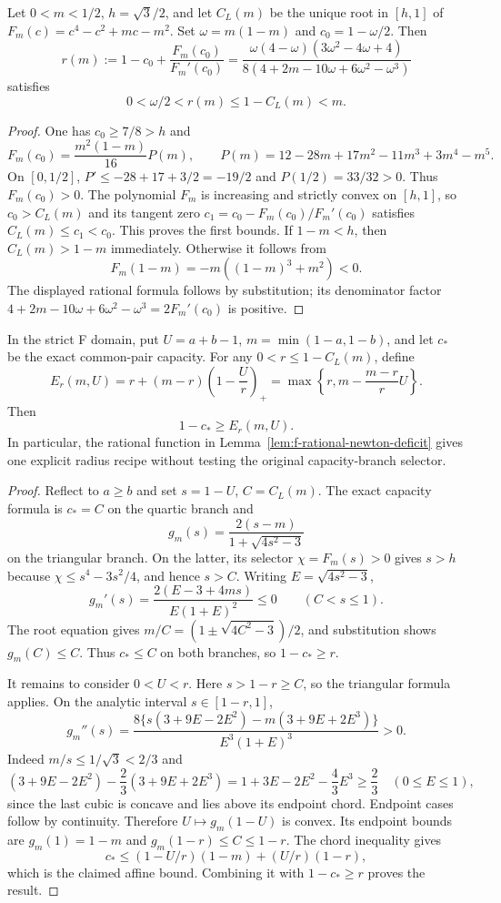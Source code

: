 \begin{lemma}
\label{lem:f-rational-newton-deficit}
Let $0<m<1/2$, $h=\sqrt3/2$, and let $C_L(m)$ be the unique root in
$[h,1]$ of $F_m(c)=c^4-c^2+mc-m^2$.
Set $\omega=m(1-m)$ and $c_0=1-\omega/2$. Then
\[
 r(m):=1-c_0+\frac{F_m(c_0)}{F_m'(c_0)}
 =\frac{\omega(4-\omega)(3\omega^2-4\omega+4)}
 {8(4+2m-10\omega+6\omega^2-\omega^3)}
\]
satisfies
\[
0<\omega/2<r(m)\le1-C_L(m)<m.
\]
\end{lemma}
\begin{proof}
One has $c_0\ge7/8>h$ and
\[
 F_m(c_0)=\frac{m^2(1-m)}{16}P(m),\qquad
 P(m)=12-28m+17m^2-11m^3+3m^4-m^5.
\]
On $[0,1/2]$, $P'\le-28+17+3/2=-19/2$ and
$P(1/2)=33/32>0$. Thus $F_m(c_0)>0$.
The polynomial $F_m$ is increasing and strictly convex on $[h,1]$,
so $c_0>C_L(m)$ and its tangent zero
$c_1=c_0-F_m(c_0)/F_m'(c_0)$ satisfies
$C_L(m)\le c_1<c_0$. This proves the first bounds.
If $1-m<h$, then $C_L(m)>1-m$ immediately. Otherwise it follows from
\[
 F_m(1-m)=-m((1-m)^3+m^2)<0.
\]
The displayed rational formula follows by substitution; its denominator
factor $4+2m-10\omega+6\omega^2-\omega^3=2F_m'(c_0)$ is positive.
\end{proof}

\begin{lemma}
\label{lem:f-uniform-affine-radius-envelope}
\label{lem:paper-branchwise-cbar}
In the strict F domain, put $U=a+b-1$, $m=\min(1-a,1-b)$, and let
$c_*$ be the exact common-pair capacity. For any
$0<r\le1-C_L(m)$, define
\[
 E_r(m,U)=r+(m-r)\left(1-\frac Ur\right)_+
 =\max\left\{r,m-\frac{m-r}{r}U\right\}.
\]
Then
\[
 1-c_*\ge E_r(m,U).
\]
In particular, the rational function in
Lemma~\ref{lem:f-rational-newton-deficit} gives one explicit radius recipe
without testing the original capacity-branch selector.
\end{lemma}
\begin{proof}
Reflect to $a\ge b$ and set $s=1-U$, $C=C_L(m)$. The exact capacity
formula is $c_*=C$ on the quartic branch and
\[
 g_m(s)=\frac{2(s-m)}{1+\sqrt{4s^2-3}}
\]
on the triangular branch. On the latter, its selector
$\chi=F_m(s)>0$ gives $s>h$ because
$\chi\le s^4-3s^2/4$, and hence $s>C$.
Writing $E=\sqrt{4s^2-3}$,
\[
 g_m'(s)=\frac{2(E-3+4ms)}{E(1+E)^2}\le0
 \qquad(C<s\le1).
\]
The root equation gives
$m/C=(1\pm\sqrt{4C^2-3})/2$, and substitution shows $g_m(C)\le C$.
Thus $c_*\le C$ on both branches, so $1-c_*\ge r$.

It remains to consider $0<U<r$. Here $s>1-r\ge C$, so the triangular
formula applies. On the analytic interval $s\in[1-r,1]$,
\[
 g_m''(s)=\frac{8\{s(3+9E-2E^2)-m(3+9E+2E^3)\}}
 {E^3(1+E)^3}>0.
\]
Indeed $m/s\le1/\sqrt3<2/3$ and
\[
 (3+9E-2E^2)-\frac23(3+9E+2E^3)
 =1+3E-2E^2-\frac43E^3\ge\frac23
 \quad(0\le E\le1),
\]
since the last cubic is concave and lies above its endpoint chord.
Endpoint cases follow by continuity. Therefore $U\mapsto g_m(1-U)$
is convex. Its endpoint bounds are
$g_m(1)=1-m$ and $g_m(1-r)\le C\le1-r$.
The chord inequality gives
\[
 c_*\le(1-U/r)(1-m)+(U/r)(1-r),
\]
which is the claimed affine bound. Combining it with $1-c_*\ge r$
proves the result.
\end{proof}
